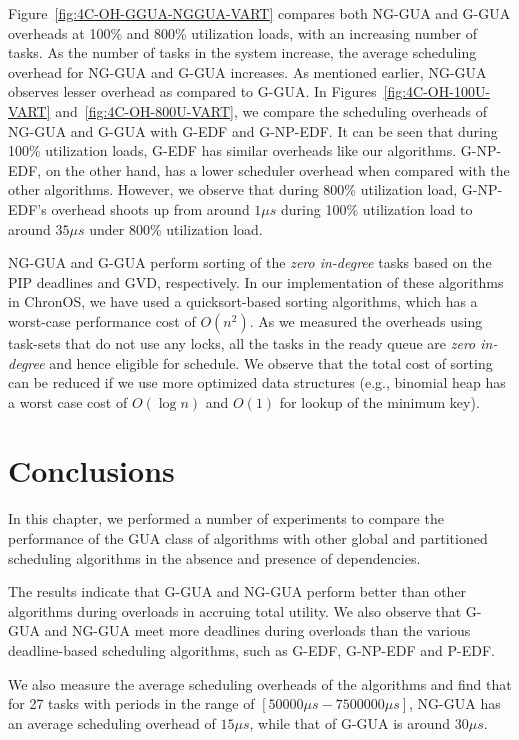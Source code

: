 \documentclass[12pt,dvips]{report}
\begin{document}
Figure~\ref{fig:4C-OH-GGUA-NGGUA-VART} compares both NG-GUA and G-GUA overheads at 100\% and 800\% utilization loads, with an increasing number of tasks. As the number of tasks in the system increase, the average scheduling overhead for NG-GUA and G-GUA increases. As mentioned earlier, NG-GUA observes lesser overhead as compared to G-GUA. In Figures~\ref{fig:4C-OH-100U-VART} and~\ref{fig:4C-OH-800U-VART}, we compare the scheduling overheads of NG-GUA and G-GUA with G-EDF and G-NP-EDF. It can be seen that during 100\% utilization loads, G-EDF has similar overheads like our algorithms. G-NP-EDF, on the other hand, has a lower scheduler overhead when compared with the other algorithms. However, we observe that during 800\% utilization load, G-NP-EDF's overhead shoots up from around $1 \mu s$ during 100\% utilization load to around $35 \mu s$ under 800\% utilization load.

NG-GUA and G-GUA perform sorting of the \textit{zero in-degree} tasks based on the PIP deadlines and GVD, respectively. In our implementation of these algorithms in ChronOS, we have used a quicksort-based sorting algorithms, which has a worst-case performance cost of $O(n^2)$. As we measured the overheads using task-sets that do not use any locks, all the tasks in the ready queue are \textit{zero in-degree} and hence eligible for schedule. We observe that the total cost of sorting can be reduced if we use more optimized data structures (e.g., binomial heap has a worst case cost of $O(\log n)$ and $O(1)$ for lookup of the minimum key).

\section{Conclusions}

In this chapter, we performed a number of experiments to compare the performance of the GUA class of algorithms with other global and partitioned scheduling algorithms in the absence and presence of dependencies. 

The results indicate that G-GUA and NG-GUA perform better than other algorithms during overloads in accruing total utility. We also observe that G-GUA and NG-GUA meet more deadlines during overloads than the various deadline-based scheduling algorithms, such as G-EDF, G-NP-EDF and P-EDF.

We also measure the average scheduling overheads of the algorithms and find that for 27 tasks with periods in the range of $[50000 \mu s - 7500000 \mu s]$, NG-GUA has an average scheduling overhead of $15 \mu s$, while that of G-GUA is around $30 \mu s$. 
\end{document}
